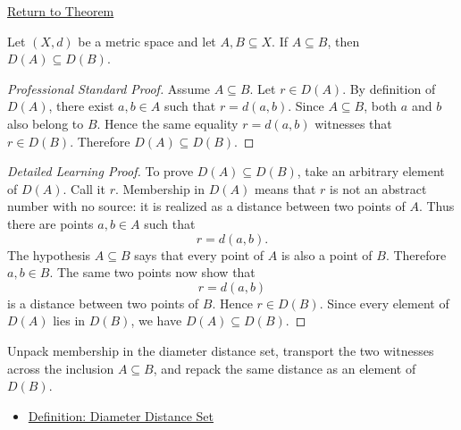 \newpage
{}
\label{prf:metric-diameter-set-monotone}

\begin{remark*}[Return]
\hyperref[thm:metric-diameter-set-monotone]{Return to Theorem}
\end{remark*}

\begin{theorem*}
Let \((X,d)\) be a metric space and let \(A,B\subseteq X\).  If
\(A\subseteq B\), then \(D(A)\subseteq D(B)\).
\end{theorem*}

\begin{proof}[Professional Standard Proof]
\LRAProofBodyStart
Assume \(A\subseteq B\).  Let \(r\in D(A)\).  By definition of \(D(A)\), there
exist \(a,b\in A\) such that \(r=d(a,b)\).  Since \(A\subseteq B\), both
\(a\) and \(b\) also belong to \(B\).  Hence the same equality \(r=d(a,b)\)
witnesses that \(r\in D(B)\).  Therefore \(D(A)\subseteq D(B)\).
\end{proof}

\begin{proof}[Detailed Learning Proof]
\LRAProofBodyStart
To prove \(D(A)\subseteq D(B)\), take an arbitrary element of \(D(A)\).  Call
it \(r\).  Membership in \(D(A)\) means that \(r\) is not an abstract number
with no source: it is realized as a distance between two points of \(A\).
Thus there are points \(a,b\in A\) such that
\[
  r=d(a,b).
\]
The hypothesis \(A\subseteq B\) says that every point of \(A\) is also a point
of \(B\).  Therefore \(a,b\in B\).  The same two points now show that
\[
  r=d(a,b)
\]
is a distance between two points of \(B\).  Hence \(r\in D(B)\).  Since every
element of \(D(A)\) lies in \(D(B)\), we have \(D(A)\subseteq D(B)\).
\end{proof}

\begin{remark*}
Unpack membership in the diameter distance set, transport the two witnesses
across the inclusion \(A\subseteq B\), and repack the same distance as an
element of \(D(B)\).
\end{remark*}

\begin{dependencies}
\begin{itemize}
  \item \hyperref[def:metric-diameter-distance-set]{Definition: Diameter Distance Set}
\end{itemize}
\end{dependencies}

\clearpage

